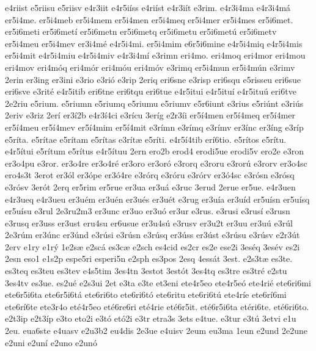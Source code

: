 {e4riist
e5riisu
e5riisv
e4r3iit
e4r5i^^edss
e4ri^^edst
e4r3i^^edt
e3rim.
e4r3i4ma
e4r3i4m^^e1
er5i4me.
er5i4meb
er5i4mem
er5i4men
er5i4meq
er5i4mer
er5i4mes
er5i6met.
er5i6meti
er5i6met^^ed
er5i6metn
er5i6metq
er5i6metu
er5i6met^^fa
er5i6metv
er5i4meu
er5i4mev
er3i4m^^e9
e4r5i4mi.
er5i4mim
e6r5i6mine
e4r5i4miq
e4r5i4mis
er5i4mit
e4r5i4miu
e4r5i4miv
e4r3i4m^^ed
e3rimn
eri4mo.
eri4moq
eri4mor
eri4mou
eri4mov
eri4m^^f3q
eri4m^^f3r
eri4m^^f3u
eri4m^^f3v
e3rimq
er5i4mun
er5i4m^^fan
e3rimv
2erin
er3ing
er3ini
e3rio
e3ri^^f3
e3rip
2eriq
eri6sne
e3risp
eri6squ
e5risseu
eri6sue
eri6sve
e3rit^^e9
e4r5itib
eri6tne
eri6tqu
eri6tue
e4r5itui
e4r5itu^^ed
e4r5itu^^fa
eri6tve
2e2riu
e5rium.
e5riumn
e5riumq
e5riumu
e5riumv
e5r6iunt
e3rius
e5ri^^fant
e3ri^^fas
2eriv
e3riz
2er^^ed
er3^^ed2b
e4r3^^ed4ci
e3r^^edcu
3er^^edg
e2r3^^edi
er5^^ed4men
er5^^ed4meq
er5^^ed4mer
er5^^ed4meu
er5^^ed4mev
er5^^ed4mim
er5^^ed4mit
e3r^^edmn
e3r^^edmq
e3r^^edmv
er3^^ednc
er3^^edng
e3r^^edp
e5r^^edta.
e5r^^edtae
e5r^^edtam
e5r^^edtas
e3r^^edt^^e6
e5r^^edti.
e4r5^^ed4tib
er^^ed6tio.
e5r^^edtos
e5r^^edtu.
e4r5^^edtui
e5r^^edtum
e5r^^edtus
e4r5^^edtuu
2ern
ero2b
erod4
erodi5ue
erodi5v
ero2e
e3ron
er3o4pu
e3ror.
er3o4re
er3o4r^^e9
er3oro
er3or^^f3
e3rorq
e3roru
e3ror^^fa
e3rorv
er3o4sc
ero4s3t
3erot
er3^^f3l
er3^^f3pe
er3^^f34re
e3r^^f3rq
e3r^^f3ru
e3r^^f3rv
er3^^f34sc
e3r^^f3sn
e3r^^f3sq
e3r^^f3sv
3er^^f3t
2erq
er5rim
er5rue
er3ua
er3u^^e1
e3ruc
3erud
2erue
er5ue.
e4r3uen
e4r3ueq
e4r3ueu
er3u^^e9m
er3u^^e9n
er3u^^e9s
er3u^^e9t
e3rug
er3u^^eda
er3u^^edd
er5u^^edsn
er5u^^edsq
er5u^^edsu
e3rul
2e3ru2m3
er3unc
er3uo
er3u^^f3
er3ur
e3rus.
e3rusi
e3rus^^ed
e3rusn
e3rusq
er3uss
er3ust
eru4su
er6usue
er3u4s^^fa
e3rusv
er3u2t
er3uu
er3u^^fa
e3r^^fal
2e3r^^fam
er3^^fanc
er3^^fand
e3r^^fasi
e3r^^fasn
e3r^^fasq
er3^^fass
er3^^fast
e3r^^fasu
e3r^^fasv
e2r3^^fat
2erv
e1ry
e1r^^fd
1e2s^^e6
e2sc^^e1
es3c^^e6
e2sch
es4cid
es2cr
es2e
ese2i
3es^^e9q
3es^^e9v
es2i
2esn
eso1
e1s2p
espe5ri
esperi5n
e2sph
es3pos
2esq
4ess^^e1t
3est.
e2s3t^^e6
es3te.
es3teq
es3teu
es3tev
e4s5tim
3es4tn
3estot
3est^^f3t
3es4tq
es3tre
es3tr^^e9
e2stu
3es4tv
es3ue.
es2u^^e9
e2s3ui
2et
e3ta
e3te
et3eni
ete4r5eo
ete4r5e^^f3
ete4ri^^e9
ete6ri6mi
ete6r5i6ta
ete6r5i6t^^e1
ete6ri6to
ete6ri6t^^f3
ete6ritu
ete6ri6t^^fa
ete4r^^ede
ete6r^^ed6mi
ete6r^^ed6te
ete3r4o
et^^e94r5eo
et^^e96re6ri
et^^e94rie
et^^e96r5it.
et^^e96r5i6ta
et^^e9ri6te.
et^^e96ri6to.
e2t3ip
e2t3^^edp
e3to
eto2i
e3t^^f3
et^^f32i
e3tr
etra3s
3ets
e4tue.
e3tur
e3t^^fa
3etvi
e1u
2eu.
eua6ste
e4uasv
e2u3b2
eu4dis
2e3ue
e4uisv
2eum
eu3ma
1eun
e2und
2e2une
e2uni
e2un^^ed
e2uno
e2un^^f3
}
